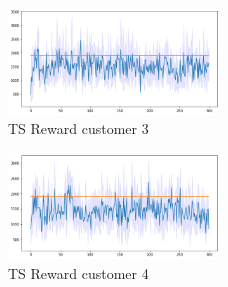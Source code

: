 \begin{multicols}{2}
    \begin{figure}[H]
        \begin{center}
        \includegraphics[width=0.5\textwidth]{img/ts7_3.png}
        \caption{TS Reward customer 3}
        \label{fig:Reward73}
        \end{center}
    \end{figure}
    \columnbreak
    \begin{figure}[H]
        \begin{center}
        \includegraphics[width=0.5\textwidth]{img/ts7_4.png}
        \caption{TS Reward customer 4}
        \label{fig:Reward74}
        \end{center}
    \end{figure}
\end{multicols}

